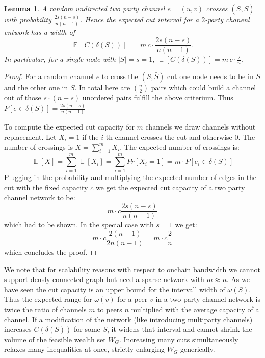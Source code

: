 \documentclass[10pt,twocolumn]{article}
\newtheorem{lemma}[theorem]{Lemma}
\DeclareMathOperator{\EE}{\mathbb{E}}
\begin{document}
\begin{lemma}
\label{lem:2pc-exact}
A random undirected two party channel $e=(u,v)$ crosses $(S,\bar S)$ with probability $\frac{2s(n-s)}{n(n-1)}$. Hence the expected cut interval for a $2$-party chanenl entwork has a width of
\[
\EE[C(\delta(S))] \;=\; m\,c\cdot \frac{2s(n-s)}{n(n-1)}.
\]
In particular, for a single node with $|S| = s=1$,
\(
\EE[C(\delta(S))] = m\,c\cdot \frac{2}{n}.
\)
\end{lemma}

\begin{proof}
  For a random channel $e$ to cross the $(S,\bar S)$ cut one node needs to be in $S$ and the other one in $\bar S$.
  In total here are $\binom{n}{2}$ pairs which could build a channel out of those $s\cdot(n-s)$ unordered pairs fulfill the above criterium.
  Thus $P[e\in\delta(S)] = \frac{2s(n-s)}{n(n-1)}$

  To compute the expected cut capacity for $m$ channels we draw channels without replacement.
  Let $X_i=1$ if the $i$-th channel crosses the cut and otherwise $0$.
  The number of crossings is $X=\sum_{i=1}^m{X_i}$.
  The expected number of crossings is:
  \begin{equation}
    \EE[X] = \sum_{i=1}^m\EE[X_i] = \sum_{i=1}^mPr[X_i = 1] = m\cdot P[e_i\in\delta(S)] 
  \end{equation}
  Plugging in the probability and multiplying the expected number of edges in the cut with the fixed capacity $c$ we get the expected cut capacity of a two party channel network to be:
  \begin{equation}
m\cdot c\frac{2s(n-s)}{n(n-1)}
    \end{equation}
  which had to be shown. In the special case with $s=1$ we get:
  \begin{equation}
m\cdot c\frac{2(n-1)}{2n(n-1)} = m\cdot c\frac{2}{n}
    \end{equation}
  which concludes the proof.
\end{proof}

We note that for scalability reasons with respect to onchain bandwidth we cannot support densly connected graph but need a sparse network with $m\approx n$.
As we have seen the cut capacity is an upper bound for the intervall width of $\omega(S)$.
Thus the expected range for $\omega(v)$ for a peer $v$ in a two party channel network is twice the ratio of channels $m$ to peers $n$ multiplied with the average capacity of a channel.
If a modification of the network (like introducing multiparty channels) increases $C(\delta(S))$ for some $S$, it widens that interval and cannot shrink the volume of the feasible wealth set $W_G$.
Increasing many cuts simultaneously relaxes many inequalities at once, strictly enlarging $W_G$ generically.
\end{document}
